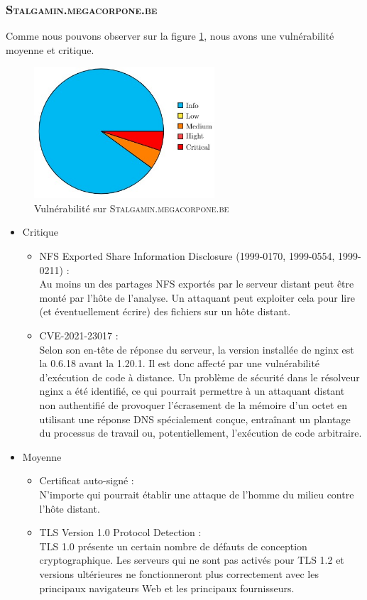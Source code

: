 \documentclass[a4paper]{article}
\begin{document}
\subsubsection{\textsc{Stalgamin.megacorpone.be}}\label{app:vulns5}
Comme nous pouvons observer sur la figure \ref{fig:vuln5}, nous avons une vulnérabilité moyenne et critique.
\begin{figure}[H]
    \centering
    \includegraphics[width=0.6\textwidth]{images/graphiques/7.jpg}
    \caption{Vulnérabilité sur \textsc{Stalgamin.megacorpone.be}}
    \label{fig:vuln5}
\end{figure}

\begin{itemize}
    \item Critique 
    \begin{itemize}
        \item NFS Exported Share Information Disclosure (1999-0170, 1999-0554, 1999-0211) :\\
        Au moins un des partages NFS exportés par le serveur distant peut être monté par l'hôte de l'analyse. Un attaquant peut exploiter cela pour lire (et éventuellement écrire) des fichiers sur un hôte distant.
        \item CVE-2021-23017 :\\
        Selon son en-tête de réponse du serveur, la version installée de nginx est la 0.6.18 avant la 1.20.1. Il est donc affecté par une vulnérabilité d'exécution de code à distance. Un problème de sécurité dans le résolveur nginx a été identifié, ce qui pourrait permettre à un attaquant distant non authentifié de provoquer l'écrasement de la mémoire d'un octet en utilisant une réponse DNS spécialement conçue, entraînant un plantage du processus de travail ou, potentiellement, l'exécution de code arbitraire.
    \end{itemize}
    \item Moyenne
    \begin{itemize}
        \item Certificat auto-signé :\\
        N'importe qui pourrait établir une attaque de l'homme du milieu contre l'hôte distant.
        \item TLS Version 1.0 Protocol Detection :\\
        TLS 1.0 présente un certain nombre de défauts de conception cryptographique. Les serveurs qui ne sont pas activés pour TLS 1.2 et versions ultérieures ne fonctionneront plus correctement avec les principaux navigateurs Web et les principaux fournisseurs.
    \end{itemize}
\end{itemize}
\end{document}
